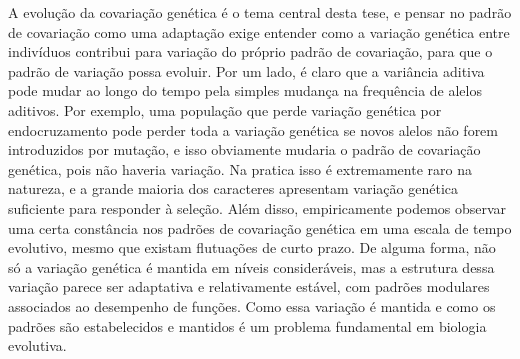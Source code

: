 \begin{refsection}
A evolução da covariação genética é o tema central desta tese, e pensar no
padrão de covariação como uma adaptação exige entender como a variação
genética entre indivíduos contribui para variação do próprio padrão de
covariação, para que o padrão de variação possa evoluir. Por um lado, é claro
que a variância aditiva pode mudar ao longo do tempo pela simples mudança na
frequência de alelos aditivos. Por exemplo, uma população que perde variação
genética por endocruzamento pode  perder toda a variação genética se novos
alelos não forem introduzidos por mutação, e isso obviamente mudaria o padrão
de covariação genética, pois não haveria variação. Na pratica isso é
extremamente raro na natureza, e a grande maioria dos caracteres apresentam
variação genética suficiente para responder à seleção. Além disso,
empiricamente podemos observar uma certa constância nos padrões de covariação
genética em uma escala de tempo evolutivo, mesmo que existam flutuações de
curto prazo. De alguma forma, não só a variação genética é mantida em níveis
consideráveis, mas a estrutura dessa variação parece ser adaptativa e
relativamente estável, com padrões modulares associados ao desempenho de
funções. Como essa variação é mantida e como os padrões são estabelecidos e
mantidos é um problema fundamental em biologia evolutiva.


\end{refsection}
